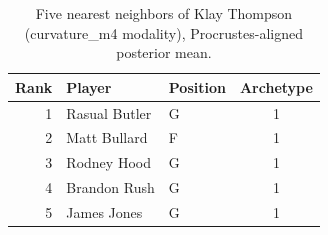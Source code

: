 \begin{table}[htbp]
  \centering\small
  \begin{tabular}{rllc}
    \toprule
    Rank & Player & Position & Archetype \\
    \midrule
    1 & Rasual Butler & G & 1 \\
    2 & Matt Bullard & F & 1 \\
    3 & Rodney Hood & G & 1 \\
    4 & Brandon Rush & G & 1 \\
    5 & James Jones & G & 1 \\
    \bottomrule
  \end{tabular}
  \caption{Five nearest neighbors of Klay Thompson (curvature_m4 modality), Procrustes-aligned posterior mean.}
  \label{tab:Klay_Thompson_neighbors_curvature_m4}
\end{table}

